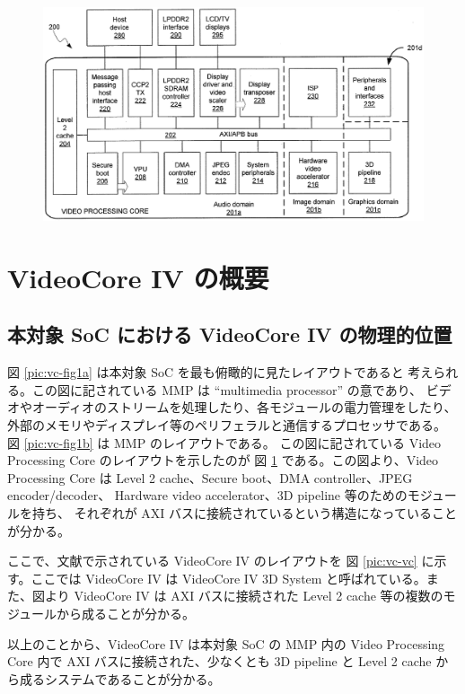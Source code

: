\documentclass{jsarticle}
\begin{document}
\begin{figure}
\includegraphics[width=\textwidth]{vc-fig2.png}
\label{pic:vc-fig2}
\end{figure}


\section{VideoCore IV の概要}

\subsection{本対象 SoC における VideoCore IV の物理的位置}

図 \ref{pic:vc-fig1a} は本対象 SoC を最も俯瞰的に見たレイアウトであると
考えられる。この図に記されている MMP は ``multimedia processor'' の意であり、
ビデオやオーディオのストリームを処理したり、各モジュールの電力管理をしたり、
外部のメモリやディスプレイ等のペリフェラルと通信するプロセッサである。
図 \ref{pic:vc-fig1b} は MMP のレイアウトである。
この図に記されている Video Processing Core のレイアウトを示したのが
図 \ref{pic:vc-fig2} である。この図より、Video Processing Core は
Level 2 cache、Secure boot、DMA controller、JPEG encoder/decoder、
Hardware video accelerator、3D pipeline 等のためのモジュールを持ち、
それぞれが AXI バスに接続されているという構造になっていることが分かる。

ここで、文献で示されている VideoCore IV のレイアウトを
図 \ref{pic:vc-vc} に示す。ここでは VideoCore IV は
VideoCore IV 3D System と呼ばれている。また、図より VideoCore IV は
AXI バスに接続された Level 2 cache 等の複数のモジュールから成ることが分かる。

以上のことから、VideoCore IV は本対象 SoC の MMP 内の
Video Processing Core 内で AXI バスに接続された、少なくとも
3D pipeline と Level 2 cache から成るシステムであることが分かる。




\end{document}

